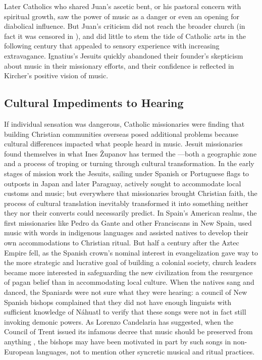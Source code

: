 Later Catholics who shared Juan's ascetic bent, or his pastoral concern with
spiritual growth, saw the power of music as a danger or even an opening for
diabolical influence.
But Juan's criticism did not reach the broader church (in fact it was censored
in ), and did little to stem the tide of Catholic arts in the
following century that appealed to sensory experience with increasing
extravagance.
Ignatius's Jesuits quickly abandoned their founder's skepticism about music in
their missionary efforts, and their confidence is reflected in Kircher's
positive vision of music.

\subsection{Cultural Impediments to Hearing}

If individual sensation was dangerous, Catholic missionaries were finding
that building Christian communities overseas posed additional problems
because cultural differences impacted what people heard in music.
Jesuit missionaries found themselves in what Ines Županov has termed the
---both a geographic zone and a process of troping
or turning through cultural transformation.%
    \Autocite{Zupanov:MissionaryTropics}
In the early stages of mission work the Jesuits, sailing under Spanish or
Portuguese flags to outposts in Japan and later Paraguay, actively sought to
accommodate local customs and music; but everywhere that missionaries brought
Christian faith, the process of cultural translation inevitably transformed it
into something neither they nor their converts could necessarily predict.%
    \Autocites
    {Bailey:Art}
    {Fromont:DancingKingCongo}
In Spain's American realms, the first missionaries like Pedro da Gante
and other Franciscans in New Spain, used music with words in indigenous
languages and assisted natives to develop their own accommodations to Christian
ritual.%
    \Autocite[637]{Candelaria:Psalmodia}
But half a century after the Aztec Empire fell, as the Spanish crown's
nominal interest in evangelization gave way to the more strategic and lucrative
goal of building a colonial society, church leaders became more interested in
safeguarding the new civilization from the resurgence of pagan belief than in
accommodating local culture. 
When the natives sang and danced, the Spaniards were not sure what they were
hearing: a council of New Spanish bishops complained that they did not have
enough linguists with sufficient knowledge of Náhuatl to verify that these
songs were not in fact still invoking demonic powers.%
    \citXXX[details]
As Lorenzo Candelaria has suggested, when the Council of Trent issued its
infamous decree that music should be preserved from anything , the bishops may have been motivated in part by such songs
in non-European languages, not to mention other syncretic musical and ritual
practices.%
    \Autocite[637--638]{Candelaria:Psalmodia}

